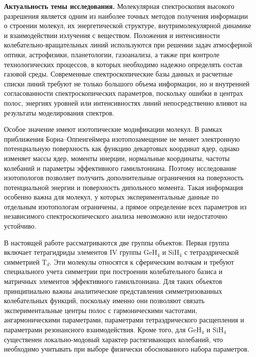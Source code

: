 {\actuality}\textbf{Актуальность темы исследования.}
Молекулярная спектроскопия высокого разрешения является одним из наиболее точных методов получения
информации о строении молекул, их энергетической структуре, внутримолекулярной динамике и
взаимодействии излучения с веществом. Положения и интенсивности колебательно-вращательных линий
используются при решении задач атмосферной оптики, астрофизики, планетологии, газоанализа, а также при
контроле технологических процессов, в которых необходимо надежно определять состав газовой среды.
Современные спектроскопические базы данных и расчетные списки линий требуют не только большого объема
информации, но и внутренней согласованности спектроскопических параметров, поскольку ошибки в центрах
полос, энергиях уровней или интенсивностях линий непосредственно влияют на результаты моделирования
спектров.

Особое значение имеют изотопические модификации молекул. В рамках приближения Борна--Оппенгеймера
изотопозамещение не меняет электронную потенциальную поверхность как функцию декартовых координат
ядер, однако изменяет массы ядер, моменты инерции, нормальные координаты, частоты колебаний и
параметры эффективного гамильтониана. Поэтому исследование изотопологов позволяет получить
дополнительные ограничения на поверхность потенциальной энергии и поверхность дипольного момента.
Такая информация особенно важна для молекул, у которых экспериментальные данные по отдельным
изотопологам ограничены, а прямое определение всех параметров из независимого спектроскопического
анализа невозможно или недостаточно устойчиво.

В настоящей работе рассматриваются две группы объектов. Первая группа включает тетрагидриды элементов
IV группы GeH$_4$ и SiH$_4$ с тетраэдрической симметрией T$_d$. Эти молекулы относятся к сферическим
волчкам и требуют специального учета симметрии при построении колебательного базиса и матричных
элементов эффективного гамильтониана. Для таких объектов принципиально важны аналитические
представления симметризованных колебательных функций, поскольку именно они позволяют связать
экспериментальные центры полос с гармоническими частотами, ангармоническими параметрами, параметрами
тетраэдрического расщепления и параметрами резонансного взаимодействия. Кроме того, для GeH$_4$ и
SiH$_4$ существенен локально-модовый характер растягивающих колебаний, что необходимо учитывать при
выборе физически обоснованного набора параметров.

